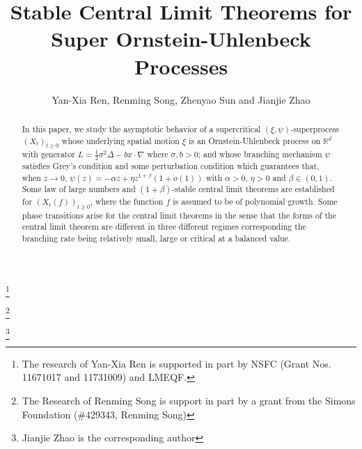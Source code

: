 \documentclass[12pt,a4paper]{amsart}
\theoremstyle{plain}
\theoremstyle{definition}
\numberwithin{equation}{section}
\begin{document}
\title
[stable CLT for super-OU processes]
{Stable Central Limit Theorems for Super Ornstein-Uhlenbeck Processes}
\author
[Y.-X. Ren, R. Song, Z. Sun and J. Zhao]
{Yan-Xia Ren, Renming Song, Zhenyao Sun and Jianjie Zhao}
\address{
  Yan-Xia Ren \\
  LMAM School of Mathematical Sciences \& Center for Statistical Science \\
  Peking University \\
  Beijing, P. R. China, 100871}
\thanks{The research of Yan-Xia Ren is supported in part by NSFC (Grant Nos. 11671017  and 11731009) and LMEQF.}
\address{
  Renming Song \\
  Department of Mathematics \\
  University of Illinois at Urbana-Champaign \\
  Urbana, IL, USA, 61801}
\thanks{The Research of Renming Song is support in part by a grant from the Simons Foundation (\#429343, Renming Song)}
\address{
  Zhenyao Sun \\
  School of Mathematics and Statistics\\
  Wuhan University \\
  Hubei, P. R. China, 100871}
\address{
  Jianjie Zhao \\
  School of Mathematical Sciences \\
  Peking University \\
  Beijing, P. R. China, 100871}
\thanks{Jianjie Zhao is the corresponding author}
\begin{abstract}
  In this paper, we study the asymptotic behavior of a supercritical $(\xi,\psi)$-superprocess $(X_t)_{t\geq 0}$
  whose underlying spatial motion $\xi$ is an Ornstein-Uhlenbeck process on $\mathbb R^d$ with generator $L = \frac{1}{2}\sigma^2\Delta - b x \cdot \nabla$ where $\sigma, b >0$;
  and whose branching mechanism $\psi$ satisfies Grey's condition and some perturbation condition which guarantees that,
 when $z\to 0$, $\psi(z)=-\alpha z + \eta z^{1+\beta} (1+o(1))$ with $\alpha > 0$, $\eta>0$ and $\beta\in (0, 1)$.
  Some law of large numbers and $(1+\beta)$-stable central limit theorems are established for
  $(X_t(f) )_{t\geq 0}$, where the function $f$ is
  assumed to be of polynomial growth.
Some phase transitions arise  for the central limit theorems in the sense that the forms of the central limit theorem are different in three different regimes corresponding the branching rate %
being relatively small, large or critical at a balanced value.
\end{abstract}
\maketitle
\end{document}
